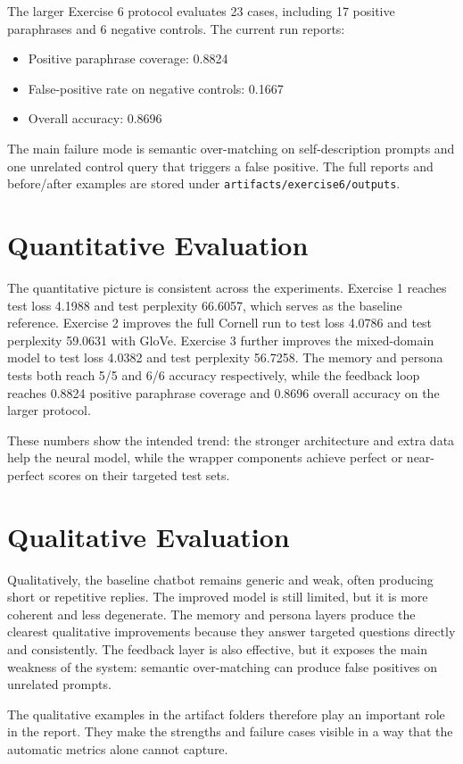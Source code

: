 \documentclass[11pt,a4paper]{article}
\begin{document}
The larger Exercise 6 protocol evaluates 23 cases, including 17 positive paraphrases and 6 negative controls. The current run reports:
\begin{itemize}[leftmargin=*]
	\item Positive paraphrase coverage: 0.8824
	\item False-positive rate on negative controls: 0.1667
	\item Overall accuracy: 0.8696
\end{itemize}

The main failure mode is semantic over-matching on self-description prompts and one unrelated control query that triggers a false positive. The full reports and before/after examples are stored under \texttt{artifacts/exercise6/outputs}.

\section{Quantitative Evaluation}
The quantitative picture is consistent across the experiments. Exercise 1 reaches test loss 4.1988 and test perplexity 66.6057, which serves as the baseline reference. Exercise 2 improves the full Cornell run to test loss 4.0786 and test perplexity 59.0631 with GloVe. Exercise 3 further improves the mixed-domain model to test loss 4.0382 and test perplexity 56.7258. The memory and persona tests both reach 5/5 and 6/6 accuracy respectively, while the feedback loop reaches 0.8824 positive paraphrase coverage and 0.8696 overall accuracy on the larger protocol.

These numbers show the intended trend: the stronger architecture and extra data help the neural model, while the wrapper components achieve perfect or near-perfect scores on their targeted test sets.

\section{Qualitative Evaluation}
Qualitatively, the baseline chatbot remains generic and weak, often producing short or repetitive replies. The improved model is still limited, but it is more coherent and less degenerate. The memory and persona layers produce the clearest qualitative improvements because they answer targeted questions directly and consistently. The feedback layer is also effective, but it exposes the main weakness of the system: semantic over-matching can produce false positives on unrelated prompts.

The qualitative examples in the artifact folders therefore play an important role in the report. They make the strengths and failure cases visible in a way that the automatic metrics alone cannot capture.
\end{document}
